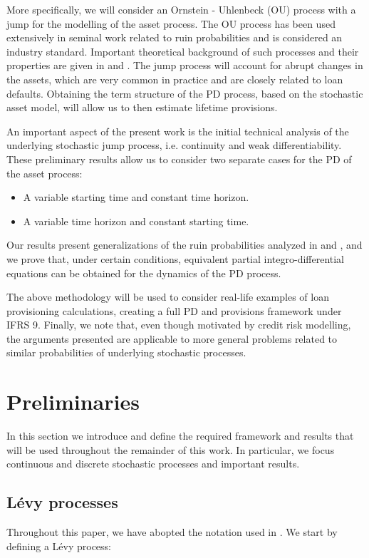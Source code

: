 \documentclass[11pt,reqno]{article}
\theoremstyle{definition}
\begin{document}
\par More specifically, we will consider an Ornstein - Uhlenbeck (OU) process with a jump for the modelling of the asset process. The OU process has been used extensively in seminal work related to ruin probabilities and is considered an industry standard. Important theoretical background of such processes and their properties are given in \cite{applebaum2009levy} and \cite{oksendal2007applied}. The jump process will account for abrupt changes in the assets, which are very common in practice and are closely related to loan defaults. Obtaining the term structure of the PD process, based on the stochastic asset model, will allow us to then estimate lifetime provisions.
\par An important aspect of the present work is the initial technical analysis of the underlying stochastic jump process, i.e. continuity and weak differentiability. These preliminary results allow us to consider two separate cases for the PD of the asset process:
\begin{itemize}
	\item A variable starting time and constant time horizon.
	\item A variable time horizon and constant starting time.
\end{itemize}
Our results present generalizations of the ruin probabilities analyzed in \cite{mishura2016ruin} and \cite{moller1995stochastic}, and we prove that, under certain conditions, equivalent partial integro-differential equations can be obtained for the dynamics of the PD process.
\par The above methodology will be used to consider real-life examples of loan provisioning calculations, creating a full PD and provisions framework under IFRS 9. Finally, we note that, even though motivated by credit risk modelling, the arguments presented are applicable to more general problems related to similar probabilities of underlying stochastic processes. 



\section{Preliminaries}
In this section we introduce and define the required framework and results that will be used throughout the remainder of this work. In particular, we focus continuous and discrete stochastic processes and important results. 
\subsection{L\'evy processes}
Throughout this paper, we have abopted the notation used in \cite{oksendal2007applied}. We start by defining a L\'evy process:
\end{document}
